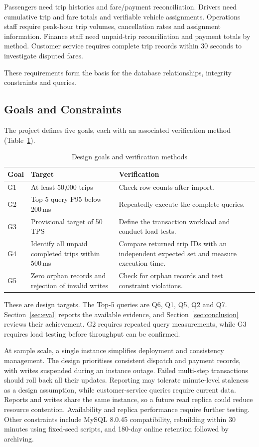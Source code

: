 Passengers need trip histories and fare/payment reconciliation. Drivers need cumulative trip and fare totals and verifiable vehicle assignments. Operations staff require peak-hour trip volumes, cancellation rates and assignment information. Finance staff need unpaid-trip reconciliation and payment totals by method. Customer service requires complete trip records within 30 seconds to investigate disputed fares.

These requirements form the basis for the database relationships, integrity constraints and queries.

\subsection{Goals and Constraints}
\label{subsec:goals}

The project defines five goals, each with an associated verification method (Table~\ref{tab:goals}).

\begin{table}[ht]
\centering
\caption{Design goals and verification methods}
\label{tab:goals}
\small
\begin{tabular}{@{}lp{5.4cm}p{8.1cm}@{}}
\toprule
Goal & Target & Verification \\
\midrule
G1 & At least 50{,}000 trips & Check row counts after import. \\
G2 & Top-5 query P95 below 200\,ms & Repeatedly execute the complete queries. \\
G3 & Provisional target of 50 TPS & Define the transaction workload and conduct load tests. \\
G4 & Identify all unpaid completed trips within 500\,ms & Compare returned trip IDs with an independent expected set and measure execution time. \\
G5 & Zero orphan records and rejection of invalid writes & Check for orphan records and test constraint violations. \\
\bottomrule
\end{tabular}
\end{table}

These are design targets. The Top-5 queries are Q6, Q1, Q5, Q2 and Q7. Section~\ref{sec:eval} reports the available evidence, and Section~\ref{sec:conclusion} reviews their achievement. G2 requires repeated query measurements, while G3 requires load testing before throughput can be confirmed.

At sample scale, a single instance simplifies deployment and consistency management. The design prioritises consistent dispatch and payment records, with writes suspended during an instance outage. Failed multi-step transactions should roll back all their updates. Reporting may tolerate minute-level staleness as a design assumption, while customer-service queries require current data. Reports and writes share the same instance, so a future read replica could reduce resource contention. Availability and replica performance require further testing. Other constraints include MySQL 8.0.45 compatibility, rebuilding within 30 minutes using fixed-seed scripts, and 180-day online retention followed by archiving.

